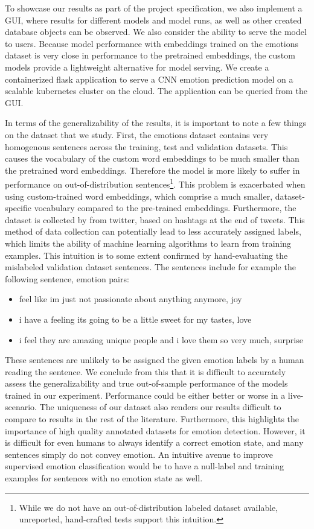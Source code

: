 \documentclass[conference]{IEEEtran}
\begin{document}
To showcase our results as part of the project specification, we also implement a GUI, where results for different models and model runs, as well as other created database objects can be observed. We also consider the ability to serve the model to users. Because model performance with embeddings trained on the emotions dataset is very close in performance to the pretrained embeddings, the custom models provide a lightweight alternative for model serving. We create a containerized flask application to serve a CNN emotion prediction model on a scalable kubernetes cluster on the cloud. The application can be queried from the GUI.

In terms of the generalizability of the results, it is important to note a few things on the dataset that we study. First, the emotions dataset contains very homogenous sentences across the training, test and validation datasets. This causes the vocabulary of the custom word embeddings to be much smaller than the pretrained word embeddings. Therefore the model is more likely to suffer in performance on out-of-distribution sentences\footnote{While we do not have an out-of-distribution labeled dataset available, unreported, hand-crafted tests support this intuition.}. This problem is exacerbated when using custom-trained word embeddings, which comprise a much smaller, dataset-specific vocabulary compared to the pre-trained embeddings. Furthermore, the dataset is collected by \cite{kaggledata} from twitter, based on hashtags at the end of tweets. This method of data collection can potentially lead to less accurately assigned labels, which limits the ability of machine learning algorithms to learn from training examples. This intuition is to some extent confirmed by hand-evaluating the mislabeled validation dataset sentences. The sentences include for example the following sentence, emotion pairs:
\begin{itemize}
\item feel like im just not passionate about anything anymore, joy
\item i have a feeling its going to be a little sweet for my tastes, love
\item i feel they are amazing unique people and i love them so very much, surprise
\end{itemize}

These sentences are unlikely to be assigned the given emotion labels by a human reading the sentence. We conclude from this that it is difficult to accurately assess the generalizability and true out-of-sample performance of the models trained in our experiment. Performance could be either better or worse in a live-scenario. The uniqueness of our dataset also renders our results difficult to compare to results in the rest of the literature. Furthermore, this highlights the importance of high quality annotated datasets for emotion detection. However, it is difficult for even humans to always identify a correct emotion state, and many sentences simply do not convey emotion. An intuitive avenue to improve supervised emotion classification would be to have a null-label and training examples for sentences with no emotion state as well.
\end{document}

